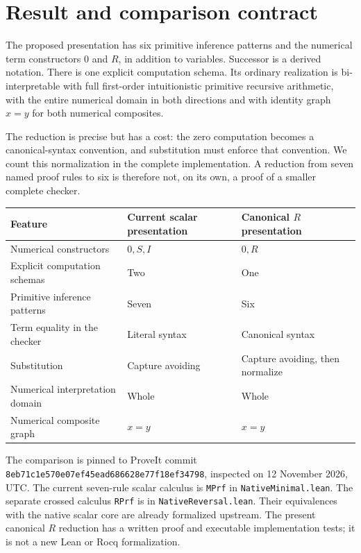 \section{Result and comparison contract}
\label{sec:assessment}

The proposed presentation has six primitive inference patterns and the
numerical term constructors $0$ and $R$, in addition to variables. Successor
is a derived notation. There is one explicit computation schema. Its
ordinary realization is bi-interpretable with full first-order intuitionistic
primitive recursive arithmetic, with the entire numerical domain in both
directions and with identity graph $x=y$ for both numerical composites.

The reduction is precise but has a cost: the zero computation becomes a
canonical-syntax convention, and substitution must enforce that convention.
We count this normalization in the complete implementation. A reduction from
seven named proof rules to six is therefore not, on its own, a proof of a
smaller complete checker.

\begin{center}
\small
\begin{tabular}{lll}
\toprule
Feature & Current scalar presentation & Canonical $R$ presentation\\
\midrule
Numerical constructors & $0,S,I$ & $0,R$\\
Explicit computation schemas & Two & One\\
Primitive inference patterns & Seven & Six\\
Term equality in the checker & Literal syntax & Canonical syntax\\
Substitution & Capture avoiding & Capture avoiding, then normalize\\
Numerical interpretation domain & Whole & Whole\\
Numerical composite graph & $x=y$ & $x=y$\\
\bottomrule
\end{tabular}
\end{center}

The comparison is pinned to ProveIt commit
\texttt{8eb71c1e570e07ef45ead686628e77f18ef34798}, inspected on
12 November 2026, UTC. The current seven-rule scalar calculus is
\texttt{MPrf} in \texttt{NativeMinimal.lean}. The separate crossed calculus
\texttt{RPrf} is in \texttt{NativeReversal.lean}. Their equivalences with the
native scalar core are already formalized upstream. The present canonical
$R$ reduction has a written proof and executable implementation tests; it is
not a new Lean or Rocq formalization.

